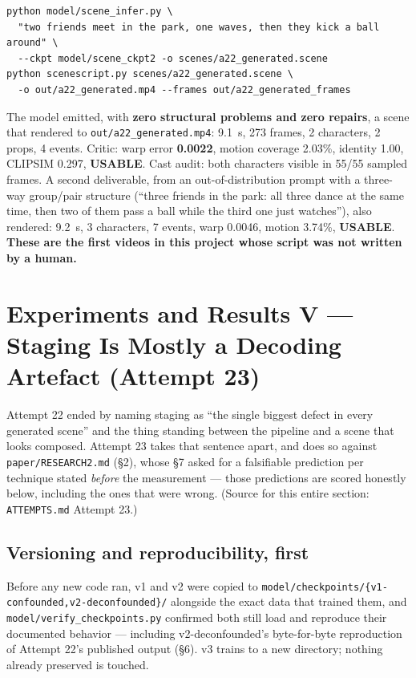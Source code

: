\documentclass[11pt]{article}
\newcommand{\secsym}{\S}
\begin{document}
\begin{verbatim}
python model/scene_infer.py \
  "two friends meet in the park, one waves, then they kick a ball around" \
  --ckpt model/scene_ckpt2 -o scenes/a22_generated.scene
python scenescript.py scenes/a22_generated.scene \
  -o out/a22_generated.mp4 --frames out/a22_generated_frames
\end{verbatim}

The model emitted, with \textbf{zero structural problems and zero
repairs}, a scene that rendered to \texttt{out/a22\_generated.mp4}:
9.1~s, 273 frames, 2 characters, 2 props, 4 events. Critic: warp error
\textbf{0.0022}, motion coverage 2.03\%, identity 1.00, CLIPSIM 0.297,
\textbf{USABLE}. Cast audit: both characters visible in 55/55 sampled
frames. A second deliverable, from an out-of-distribution prompt with a
three-way group/pair structure (``three friends in the park: all three
dance at the same time, then two of them pass a ball while the third one
just watches''), also rendered: 9.2~s, 3 characters, 7 events, warp
0.0046, motion 3.74\%, \textbf{USABLE}. \textbf{These are the first
videos in this project whose script was not written by a human.}

\section{Experiments and Results V --- Staging Is Mostly a Decoding Artefact (Attempt 23)}
\label{sec:results5}

Attempt 22 ended by naming staging as ``the single biggest defect in
every generated scene'' and the thing standing between the pipeline and
a scene that looks composed. Attempt 23 takes that sentence apart, and
does so against \texttt{paper/RESEARCH2.md} (\secsym2), whose \secsym7
asked for a falsifiable prediction per technique stated \emph{before} the
measurement --- those predictions are scored honestly below, including
the ones that were wrong. (Source for this entire section:
\texttt{ATTEMPTS.md} Attempt 23.)

\subsection{Versioning and reproducibility, first}
\label{sec:versioning-a23}

Before any new code ran, v1 and v2 were copied to
\texttt{model/checkpoints/\{v1-confounded,v2-deconfounded\}/} alongside
the exact data that trained them, and \texttt{model/verify\_checkpoints.py}
confirmed both still load and reproduce their documented behavior ---
including v2-deconfounded's byte-for-byte reproduction of Attempt 22's
published output (\secsym6). v3 trains to a new directory; nothing
already preserved is touched.
\end{document}
